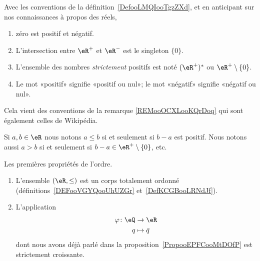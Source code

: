 \begin{normaltext}\label{REMooOCXLooKQrDoq}
    Avec les conventions de la définition~\ref{DefooLMQIooTgzZXd}, et en anticipant sur nos connaissances à propos des réels,
    \begin{enumerate}
        \item
            zéro est positif et négatif.
        \item
            L'intersection entre \( \eR^+\) et \( \eR^-\) est le singleton \( \{ 0 \}\).
        \item
            L'ensemble des nombres \emph{strictement} positifs est noté \( (\eR^+)^*\) ou \( \eR^+\setminus\{ 0 \}\).
        \item
            Le mot «positif» signifie «positif ou nul»; le mot «négatif» signifie «négatif ou nul».
    \end{enumerate}

    Cela vient des conventions de la remarque \ref{REMooOCXLooKQrDoq} qui sont également celles de Wikipédia\cite{ooSBSSooTlnuKi}.
\end{normaltext}

\begin{definition}     \label{DefooYALBooHSXZqB}
    Si \( a,b\in \eR\) nous notons \( a\leq b\) si et seulement si \( b-a\) est positif. Nous notons aussi \( a>b\) si et seulement si \( b-a\in \eR^+\setminus\{ 0 \}\), etc.
\end{definition}

\begin{lemma}       \label{LemooRordonne}
    Les premières propriétés de l'ordre.
    \begin{enumerate}
        \item
            L'ensemble \( (\eR,\leq)\) est un corps totalement ordonné (définitions~\ref{DEFooVGYQooUhUZGr} et~\ref{DefKCGBooLRNdJf}).
        \item
            L'application
            \begin{equation}
                \begin{aligned}
                    \varphi\colon \eQ&\to \eR \\
                    q&\mapsto \bar q
                \end{aligned}
            \end{equation}
            dont nous avons déjà parlé dans la proposition~\ref{PropooEPFCooMtDOfP} est strictement croissante.
    \end{enumerate}
\end{lemma}

